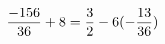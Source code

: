 \documentclass[preview]{standalone}
\begin{document}
\begin{align*}
\special{dvisvgm:raw <g id='unique000'>}\frac{-156}{36} + 8 = \frac{3}{2} - 6(- \frac{13}{36})\special{dvisvgm:raw </g>}
\end{align*}
\end{document}
